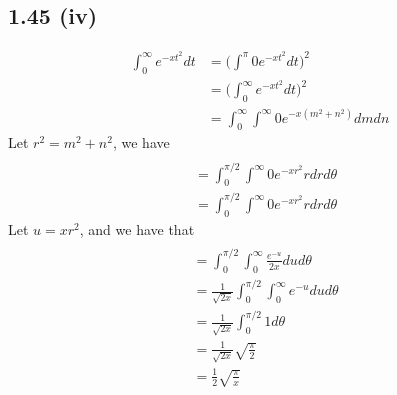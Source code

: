 \documentclass[letterpaper,12pt]{article}
\theoremstyle{definition}
\begin{document}
\subsection*{1.45 (iv)}
\begin{align*}
    \int^{\infty}_{0} e^{-xt^2} dt &= \Big( \int^{\pi}{0} e^{-xt^2} dt\Big)^2
    \\&= \Big( \int^{\infty}_{0} e^{-xt^2} dt\Big)^2
    \\&= \int^{\infty}_{0} \int^{\infty}{0} e^{-x(m^2 + n^2)} dm dn
\end{align*}
    Let $r^2 = m^2 + n^2$, we have  
\begin{align*}
    \\&= \int^{\pi/2}_{0} \int^{\infty}{0} e^{-xr^2}r dr d\theta
    \\&= \int^{\pi/2}_{0} \int^{\infty}{0} e^{-xr^2}r dr d\theta
\end{align*}
Let $u = xr^2$, and we have that
\begin{align*}
    \\&= \int^{\pi/2}_{0} \int^{\infty}_{0} \frac{e^{-u}}{2x} du d\theta
    \\&=\frac{1}{\sqrt{2x}} \int^{\pi/2}_{0} \int^{\infty}_{0} e^{-u} du d\theta
    \\&=\frac{1}{\sqrt{2x}} \int^{\pi/2}_{0} 1 d\theta
    \\&=\frac{1}{\sqrt{2x}} \sqrt{\frac{\pi}{2}} 
    \\&=\frac{1}{2} \sqrt{\frac{\pi}{x}} 
\end{align*}
\end{document}
